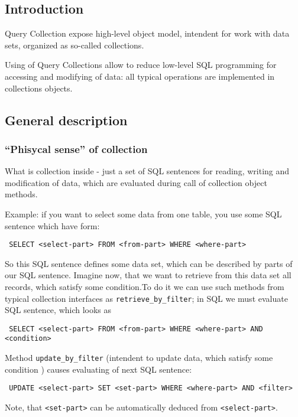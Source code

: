 

\subsection{ Introduction }

 Query Collection expose high-level object model, intendent for 
work with data sets, organized as so-called collections.

 Using of Query Collections allow to reduce low-level SQL programming for
 accessing and modifying of data: all typical operations are implemented
 in collections objects.

\subsection{ General description  }

\subsubsection{ ``Phisycal sense'' of collection }

 What is collection inside - just a set of SQL sentences for reading, writing
and modification of data, which are evaluated during call of collection object methods.

 Example: if you want to select some data from one table, you use
some SQL sentence which have form:

\begin{verbatim}
 SELECT <select-part> FROM <from-part> WHERE <where-part>
\end{verbatim}

So this SQL sentence defines some data set, which can be described by
 parts of our SQL sentence.
Imagine now, that we want to retrieve from this data set all records, which
satisfy some condition.To do it we can use such methods from typical collection interfaces 
as \verb|retrieve_by_filter|; in SQL we must evaluate SQL sentence,
which looks as 
\begin{verbatim}
 SELECT <select-part> FROM <from-part> WHERE <where-part> AND <condition>
\end{verbatim}
 Method \verb|update_by_filter| (intendent to update data, which 
satisfy some condition ) causes evaluating of next SQL sentence:
\begin{verbatim}
 UPDATE <select-part> SET <set-part> WHERE <where-part> AND <filter>
\end{verbatim}
Note, that \verb|<set-part>| can be automatically 
deduced from \verb|<select-part>|.

